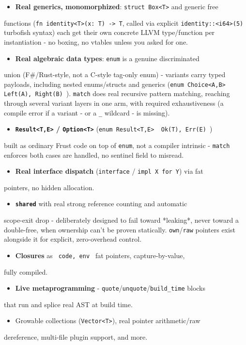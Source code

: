 \documentclass{book}
\begin{document}
\begin{itemize}
\item \textbf{Real generics, monomorphized}: \texttt{struct Box<T>} and generic free
\end{itemize}
  functions (\texttt{fn identity<T>(x: T) -> T}, called via explicit
  \texttt{identity::<i64>(5)} turbofish syntax) each get their own concrete
  LLVM type/function per instantiation - no boxing, no vtables unless
  you asked for one.
\begin{itemize}
\item \textbf{Real algebraic data types}: \texttt{enum} is a genuine discriminated
\end{itemize}
  union (F#/Rust-style, not a C-style tag-only enum) - variants carry
  typed payloads, including nested enums/structs and generics
  (\texttt{enum Choice<A,B> { Left(A), Right(B) }}). \texttt{match} does real
  recursive pattern matching, reaching through several variant layers
  in one arm, with required exhaustiveness (a compile error if a
  variant - or a \texttt{_} wildcard - is missing).
\begin{itemize}
\item \textbf{\texttt{Result<T,E>} / \texttt{Option<T>}} (\texttt{enum Result<T,E> { Ok(T), Err(E) }})
\end{itemize}
  built as ordinary Frust code on top of \texttt{enum}, not a compiler
  intrinsic - \texttt{match} enforces both cases are handled, no sentinel
  field to misread.
\begin{itemize}
\item \textbf{Real interface dispatch} (\texttt{interface} / \texttt{impl X for Y}) via fat
\end{itemize}
  pointers, no hidden allocation.
\begin{itemize}
\item \textbf{\texttt{shared}} with real strong reference counting and automatic
\end{itemize}
  scope-exit drop - deliberately designed to fail toward *leaking*,
  never toward a double-free, when ownership can't be proven
  statically. \texttt{own}/\texttt{raw} pointers exist alongside it for explicit,
  zero-overhead control.
\begin{itemize}
\item \textbf{Closures} as \texttt{{ code, env }} fat pointers, capture-by-value,
\end{itemize}
  fully compiled.
\begin{itemize}
\item \textbf{Live metaprogramming} - \texttt{quote}/\texttt{unquote}/\texttt{build_time} blocks
\end{itemize}
  that run and splice real AST at build time.
\begin{itemize}
\item Growable collections (\texttt{Vector<T>}), real pointer arithmetic/raw
\end{itemize}
  dereference, multi-file plugin support, and more.
\end{document}
